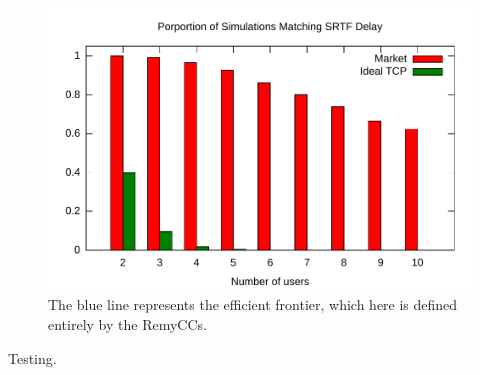 \begin{figure}
\includegraphics[width=\columnwidth]{plots/percent_match_srtf.pdf}
\caption{The blue line represents the efficient frontier, which here is defined entirely by the RemyCCs.}
\label{f:percent_match_srtf}
\end{figure}

Testing.
